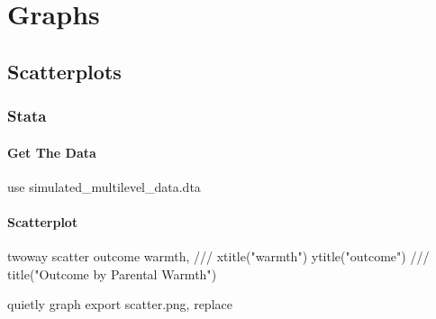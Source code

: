 \documentclass[
  letterpaper,
  DIV=11,
  numbers=noendperiod]{scrreprt}
\newenvironment{Shaded}{\begin{snugshade}}{\end{snugshade}}
\newcommand{\BaseNTok}[1]{\textcolor[rgb]{0.68,0.00,0.00}{#1}}
\newcommand{\CommentTok}[1]{\textcolor[rgb]{0.37,0.37,0.37}{#1}}
\newcommand{\KeywordTok}[1]{\textcolor[rgb]{0.00,0.23,0.31}{#1}}
\newcommand{\NormalTok}[1]{\textcolor[rgb]{0.00,0.23,0.31}{#1}}
\newcommand{\StringTok}[1]{\textcolor[rgb]{0.13,0.47,0.30}{#1}}
\begin{document}

\chapter{Graphs}\label{graphs}

\section{Scatterplots}\label{scatterplots}

\subsection{Stata}

\subsubsection{Get The Data}\label{get-the-data}

\begin{Shaded}
\begin{Highlighting}[]

\KeywordTok{use}\NormalTok{ simulated\_multilevel\_data.dta}
\end{Highlighting}
\end{Shaded}

\subsubsection{Scatterplot}\label{scatterplot}

\begin{Shaded}
\begin{Highlighting}[]
\KeywordTok{twoway} \KeywordTok{scatter}\NormalTok{ outcome warmth, }\CommentTok{///}
  \BaseNTok{xtitle}\NormalTok{(}\StringTok{"warmth"}\NormalTok{) }\BaseNTok{ytitle}\NormalTok{(}\StringTok{"outcome"}\NormalTok{) }\CommentTok{///}
  \BaseNTok{title}\NormalTok{(}\StringTok{"Outcome by Parental Warmth"}\NormalTok{) }

\KeywordTok{quietly} \KeywordTok{graph} \KeywordTok{export} \KeywordTok{scatter}\NormalTok{.png, }\KeywordTok{replace}
\end{Highlighting}
\end{Shaded}
\end{document}
